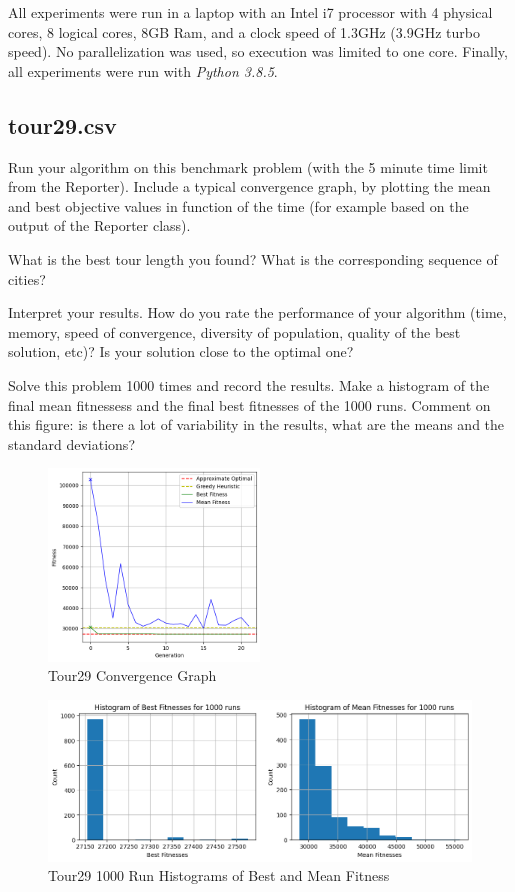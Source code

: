 \documentclass[a4paper,10pt]{article}
\newcommand{\ReplaceMe}[1]{{\color{blue}#1}}
\begin{document}
All experiments were run in a laptop with an Intel i7 processor with 4 physical cores, 8 logical cores, 8GB Ram, and a clock speed of 1.3GHz (3.9GHz turbo speed). No parallelization was used, so execution was limited to one core. Finally, all experiments were run with \textit{Python 3.8.5}.

\subsection{tour29.csv}



\ReplaceMe{Run your algorithm on this benchmark problem (with the 5 minute time limit from the Reporter). Include a typical convergence graph, by plotting the mean and best objective values in function of the time (for example based on the output of the Reporter class). 

What is the best tour length you found? What is the corresponding sequence of cities? 

Interpret your results. How do you rate the performance of your algorithm (time, memory, speed of convergence, diversity of population, quality of the best solution, etc)? Is your solution close to the optimal one?

Solve this problem 1000 times and record the results. Make a histogram of the final mean fitnessess and the final best fitnesses of the 1000 runs. Comment on this figure: is there a lot of variability in the results, what are the means and the standard deviations?}

\begin{figure}[H]
    \centering
	\includegraphics[width=0.5\textwidth]{results/4.2/tour29_convergence.png}
    \caption{Tour29 Convergence Graph}
    \label{fig:tour29convergence}
\end{figure}

\begin{figure}[H]
     \centering
     \includegraphics[width=\textwidth]{results/4.2/tour29_histogram.png}
     \caption{Tour29 1000 Run Histograms of Best and Mean Fitness}
     \label{fig:tour29histogram}
\end{figure}
\end{document}
